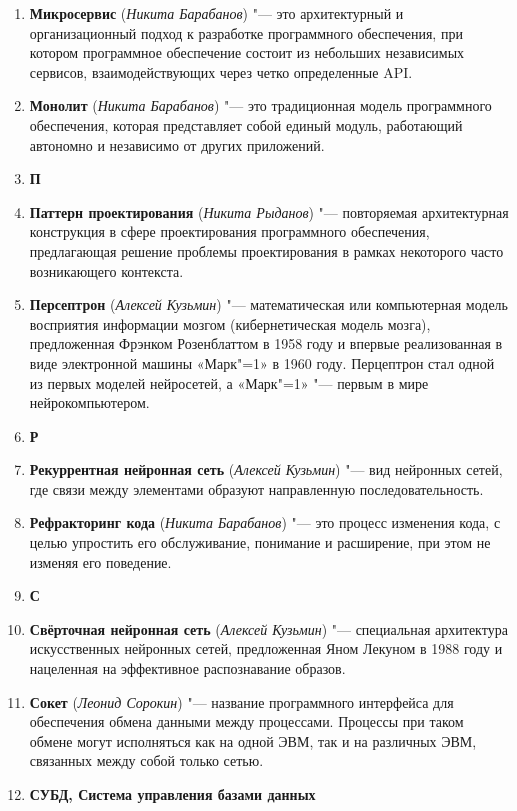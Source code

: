 \documentclass[a4paper, 14 pt]{extarticle}
\begin{document}
\begin{enumerate}
    \item \textbf{Микросервис} (\textit{Никита Барабанов}) "--- это 
    архитектурный и организационный подход к разработке программного 
    обеспечения, при котором программное обеспечение состоит из небольших 
    независимых сервисов, взаимодействующих через четко определенные API.
    \item \textbf{Монолит} (\textit{Никита Барабанов}) "--- это традиционная 
    модель программного обеспечения, которая представляет собой единый модуль, 
    работающий автономно и независимо от других приложений.
    \item[] \textbf{П}
    \item \textbf{Паттерн проектирования} (\textit{Никита Рыданов}) "--- 
    повторяемая архитектурная конструкция в сфере проектирования программного 
    обеспечения, предлагающая решение проблемы проектирования в рамках 
    некоторого часто возникающего контекста.
    \item \textbf{Персептрон} (\textit{Алексей Кузьмин}) "--- математическая или
    компьютерная модель восприятия информации мозгом (кибернетическая модель 
    мозга), предложенная Фрэнком Розенблаттом в 1958 году и впервые 
    реализованная в виде электронной машины «Марк"=1» в 1960 году. Перцептрон 
    стал одной из первых моделей нейросетей, а «Марк"=1» "--- первым в мире 
    нейрокомпьютером.
    \item[] \textbf{Р}
    \item \textbf{Рекуррентная нейронная сеть} (\textit{Алексей Кузьмин}) "--- 
    вид нейронных сетей, где связи между элементами образуют направленную 
    последовательность.
    \item \textbf{Рефракторинг кода} (\textit{Никита Барабанов}) "--- это 
    процесс изменения кода, с целью упростить его обслуживание, понимание и 
    расширение, при этом не изменяя его поведение. 
    \item[] \textbf{С}
    \item \textbf{Свёрточная нейронная сеть} (\textit{Алексей Кузьмин}) "--- 
    специальная архитектура искусственных нейронных сетей, предложенная Яном 
    Лекуном в 1988 году и нацеленная на эффективное распознавание образов. 
    \item \textbf{Сокет} (\textit{Леонид Сорокин}) "--- название программного 
    интерфейса для обеспечения обмена данными между процессами. Процессы при 
    таком обмене могут исполняться как на одной ЭВМ, так и на различных ЭВМ, 
    связанных между собой только сетью. 
    \item \textbf{СУБД, Система управления базами данных} 

\end{enumerate}
\end{document}
